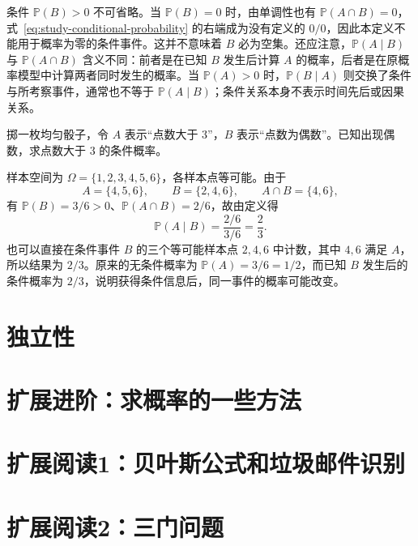 \documentclass[UTF8,12pt,a4paper,fontset=fandol]{ctexbook}
\begin{document}
条件 $\mathbb P(B)>0$ 不可省略。当 $\mathbb P(B)=0$ 时，由单调性也有 $\mathbb P(A\cap B)=0$，式~\eqref{eq:study-conditional-probability} 的右端成为没有定义的 $0/0$，因此本定义不能用于概率为零的条件事件。这并不意味着 $B$ 必为空集。还应注意，$\mathbb P(A\mid B)$ 与 $\mathbb P(A\cap B)$ 含义不同：前者是在已知 $B$ 发生后计算 $A$ 的概率，后者是在原概率模型中计算两者同时发生的概率。当 $\mathbb P(A)>0$ 时，$\mathbb P(B\mid A)$ 则交换了条件与所考察事件，通常也不等于 $\mathbb P(A\mid B)$；条件关系本身不表示时间先后或因果关系。

\begin{example}
\label{ex:study-conditional-probability-die}
掷一枚均匀骰子，令 $A$ 表示“点数大于 $3$”，$B$ 表示“点数为偶数”。已知出现偶数，求点数大于 $3$ 的条件概率。
\end{example}

\begin{solve}
样本空间为 $\Omega=\{1,2,3,4,5,6\}$，各样本点等可能。由于
\[
  A=\{4,5,6\},\qquad B=\{2,4,6\},\qquad A\cap B=\{4,6\},
\]
有 $\mathbb P(B)=3/6>0$、$\mathbb P(A\cap B)=2/6$，故由定义得
\[
  \mathbb P(A\mid B)=\frac{2/6}{3/6}=\frac23.
\]
也可以直接在条件事件 $B$ 的三个等可能样本点 $2,4,6$ 中计数，其中 $4,6$ 满足 $A$，所以结果为 $2/3$。原来的无条件概率为 $\mathbb P(A)=3/6=1/2$，而已知 $B$ 发生后的条件概率为 $2/3$，说明获得条件信息后，同一事件的概率可能改变。
\end{solve}

\section{独立性}
\label{sec:study-independence}

\section{扩展进阶：求概率的一些方法}
\label{sec:study-probability-methods}

\section{扩展阅读1：贝叶斯公式和垃圾邮件识别}
\label{sec:study-bayes-spam}

\section{扩展阅读2：三门问题}
\label{sec:study-monty-hall}
\end{document}
